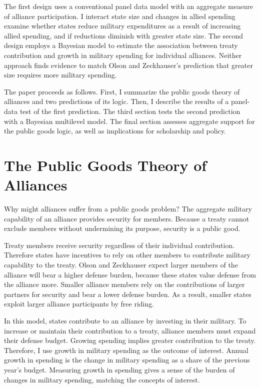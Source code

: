 \documentclass[12pt]{article}
\begin{document}
The first design uses a conventional panel data model with an aggregate measure of alliance participation. 
I interact state size and changes in allied spending examine whether states reduce military expenditures as a result of increasing allied spending, and if reductions diminish with greater state size. 
The second design employs a Bayesian model to estimate the association between treaty contribution and growth in military spending for individual alliances. 
Neither approach finds evidence to match Olson and Zeckhauser's prediction that greater size requires more military spending. 


The paper proceeds as follows.
First, I summarize the public goods theory of alliances and two predictions of its logic.
Then, I describe the results of a panel-data test of the first prediction.
The third section tests the second prediction with a Bayesian multilevel model. 
The final section assesses aggregate support for the public goods logic, as well as implications for scholarship and policy. 



\section{The Public Goods Theory of Alliances}


Why might alliances suffer from a public goods problem? 
The aggregate military capability of an alliance provides security for members. 
Because a treaty cannot exclude members without undermining its purpose, security is a public good. 


Treaty members receive security regardless of their individual contribution. 
Therefore states have incentives to rely on other members to contribute military capability to the treaty. 
Olson and Zeckhauser expect larger members of the alliance will bear a higher defense burden, because these states value defense from the alliance more. 
Smaller alliance members rely on the contributions of larger partners for security and bear a lower defense burden.
As a result, smaller states exploit larger alliance participants by free riding. 


In this model, states contribute to an alliance by investing in their military. 
To increase or maintain their contribution to a treaty, alliance members must expand their defense budget. 
Growing spending implies greater contribution to the treaty. 
Therefore, I use growth in military spending as the outcome of interest. 
Annual growth in spending is the change in military spending as a share of the previous year's budget. 
Measuring growth in spending gives a sense of the burden of changes in military spending, matching the concepts of interest. 
\end{document}
